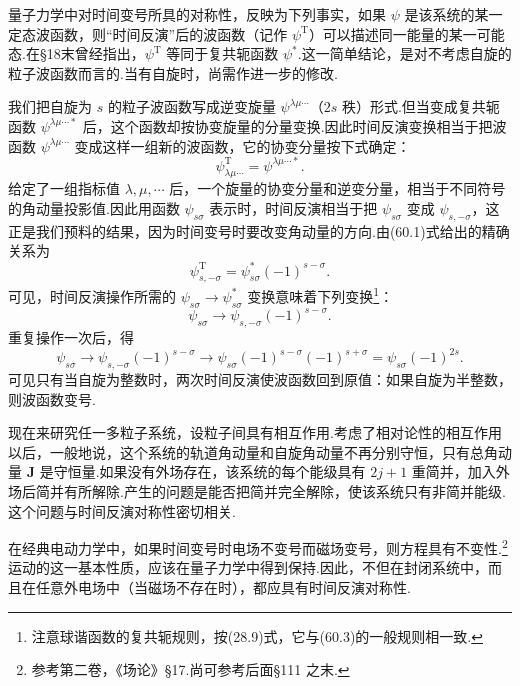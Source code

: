 量子力学中对时间变号所具的对称性，反映为下列事实，如果 $\psi$ 是该系统的某一定态波函数，则“时间反演”后的波函数（记作 $\psi^{\mathrm{T}}$）可以描述同一能量的某一可能态.在§18末曾经指出，$\psi^{\mathrm{T}}$ 等同于复共轭函数 $\psi^*$.这一简单结论，是对不考虑自旋的粒子波函数而言的.当有自旋时，尚需作进一步的修改.

我们把自旋为 $s$ 的粒子波函数写成逆变旋量 $\psi^{\lambda\mu\cdots}$（$2s$ 秩）形式.但当变成复共轭函数 $\psi^{\lambda\mu\cdots *}$ 后，这个函数却按协变旋量的分量变换.因此时间反演变换相当于把波函数 $\psi^{\lambda\mu\cdots}$ 变成这样一组新的波函数，它的协变分量按下式确定：
\begin{equation}
  \psi^{\mathrm{T}}_{\lambda\mu\cdots}=\psi^{\lambda\mu\cdots *}.
\end{equation}
给定了一组指标值 $\lambda,\mu,\cdots$ 后，一个旋量的协变分量和逆变分量，相当于不同符号的角动量投影值.因此用函数 $\psi_{s\sigma}$ 表示时，时间反演相当于把 $\psi_{s\sigma}$ 变成 $\psi_{s,-\sigma}$，这正是我们预料的结果，因为时间变号时要改变角动量的方向.由(60.1)式给出的精确关系为
\begin{equation}
  \psi^{\mathrm{T}}_{s,-\sigma}=\psi^*_{s\sigma}(-1)^{s-\sigma}.
\end{equation}
可见，时间反演操作所需的 $\psi_{s\sigma}\to\psi^*_{s\sigma}$ 变换意味着下列变换\footnote{注意球谐函数的复共轭规则，按(28.9)式，它与(60.3)的一般规则相一致.}：
\begin{equation*}
  \psi_{s\sigma}\longrightarrow\psi_{s,-\sigma}(-1)^{s-\sigma}.
\end{equation*}
重复操作一次后，得
\begin{equation}
  \psi_{s\sigma}\to\psi_{s,-\sigma}(-1)^{s-\sigma}
  \to\psi_{s\sigma}(-1)^{s-\sigma}(-1)^{s+\sigma}
  =\psi_{s\sigma}(-1)^{2s}.
\end{equation}
可见只有当自旋为整数时，两次时间反演使波函数回到原值：如果自旋为半整数，则波函数变号.

现在来研究任一多粒子系统，设粒子间具有相互作用.考虑了相对论性的相互作用以后，一般地说，这个系统的轨道角动量和自旋角动量不再分别守恒，只有总角动量 $\boldsymbol{J}$ 是守恒量.如果没有外场存在，该系统的每个能级具有 $2j+1$ 重简并，加入外场后简并有所解除.产生的问题是能否把简并完全解除，使该系统只有非简并能级.这个问题与时间反演对称性密切相关.

在经典电动力学中，如果时间变号时电场不变号而磁场变号，则方程具有不变性.\footnote{参考第二卷，《场论》§17.尚可参考后面§111 之末.}运动的这一基本性质，应该在量子力学中得到保持.因此，不但在封闭系统中，而且在任意外电场中（当磁场不存在时），都应具有时间反演对称性.


